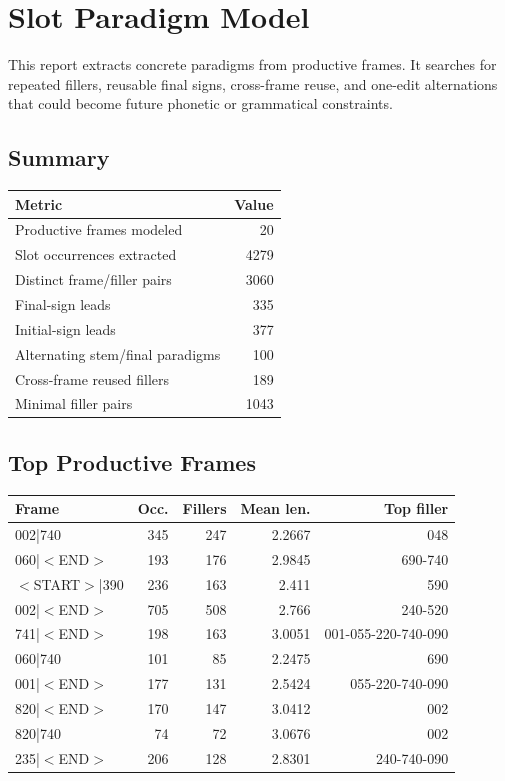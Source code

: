 \documentclass[11pt,a4paper]{article}
\begin{document}
\section*{Slot Paradigm Model}
This report extracts concrete paradigms from productive frames. It searches for repeated fillers, reusable final signs, cross-frame reuse, and one-edit alternations that could become future phonetic or grammatical constraints.
\subsection*{Summary}
\begin{center}
\begin{tabular}{lr}
\toprule
\textbf{Metric} & \textbf{Value} \\
\midrule
Productive frames modeled & 20 \\
Slot occurrences extracted & 4279 \\
Distinct frame/filler pairs & 3060 \\
Final-sign leads & 335 \\
Initial-sign leads & 377 \\
Alternating stem/final paradigms & 100 \\
Cross-frame reused fillers & 189 \\
Minimal filler pairs & 1043 \\
\bottomrule
\end{tabular}
\end{center}
\subsection*{Top Productive Frames}
\begin{center}
\begin{tabular}{lrrrr}
\toprule
\textbf{Frame} & \textbf{Occ.} & \textbf{Fillers} & \textbf{Mean len.} & \textbf{Top filler} \\
\midrule
002|740 & 345 & 247 & 2.2667 & 048 \\
060|$<$END$>$ & 193 & 176 & 2.9845 & 690-740 \\
$<$START$>$|390 & 236 & 163 & 2.411 & 590 \\
002|$<$END$>$ & 705 & 508 & 2.766 & 240-520 \\
741|$<$END$>$ & 198 & 163 & 3.0051 & 001-055-220-740-090 \\
060|740 & 101 & 85 & 2.2475 & 690 \\
001|$<$END$>$ & 177 & 131 & 2.5424 & 055-220-740-090 \\
820|$<$END$>$ & 170 & 147 & 3.0412 & 002 \\
820|740 & 74 & 72 & 3.0676 & 002 \\
235|$<$END$>$ & 206 & 128 & 2.8301 & 240-740-090 \\
\bottomrule
\end{tabular}
\end{center}
\end{document}

